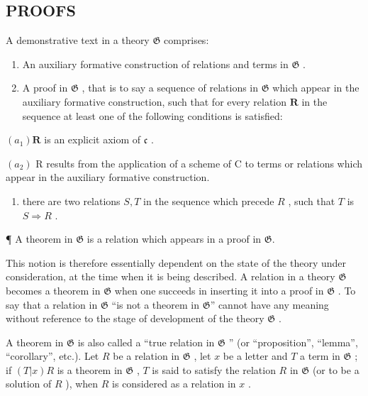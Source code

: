 \subsection{PROOFS}

A demonstrative text in a theory \(\mathfrak{G}\) comprises:

\begin{enumerate}
\def\labelenumi{(\arabic{enumi})}
\item
  An auxiliary formative construction of relations and terms in \(\mathfrak{G}\) .
\item
  A proof in \(\mathfrak{G}\) , that is to say a sequence of relations in \(\mathfrak{G}\) which appear in the auxiliary formative construction, such that for every relation \(\pmb{R}\) in the sequence at least one of the following conditions is satisfied:
\end{enumerate}

\((a_{1})\boldsymbol{R}\) is an explicit axiom of \(\mathfrak{c}\) .

\((a_{2})\) R results from the application of a scheme of C to terms or relations which appear in the auxiliary formative construction.

\begin{enumerate}
\def\labelenumi{(\alph{enumi})}
\setcounter{enumi}{1}
\tightlist
\item
  there are two relations \(S, T\) in the sequence which precede \(R\) , such that \(T\) is \(S \Longrightarrow R\) .
\end{enumerate}

¶ A theorem in \(\mathfrak{G}\) is a relation which appears in a proof in \(\mathfrak{G}\).

This notion is therefore essentially dependent on the state of the theory under consideration, at the time when it is being described. A relation in a theory \(\mathfrak{G}\) becomes a theorem in \(\mathfrak{G}\) when one succeeds in inserting it into a proof in \(\mathfrak{G}\) . To say that a relation in \(\mathfrak{G}\) ``is not a theorem in \(\mathfrak{G}\)'' cannot have any meaning without reference to the stage of development of the theory \(\mathfrak{G}\) .

A theorem in \(\mathfrak{G}\) is also called a ``true relation in \(\mathfrak{G}\) '' (or ``proposition'', ``lemma'', ``corollary'', etc.). Let \(R\) be a relation in \(\mathfrak{G}\) , let \(x\) be a letter and \(T\) a term in \(\mathfrak{G}\) ; if \((T|x)R\) is a theorem in \(\mathfrak{G}\) , \(T\) is said to satisfy the relation \(R\) in \(\mathfrak{G}\) (or to be a solution of \(R\) ), when \(R\) is considered as a relation in \(x\) .

